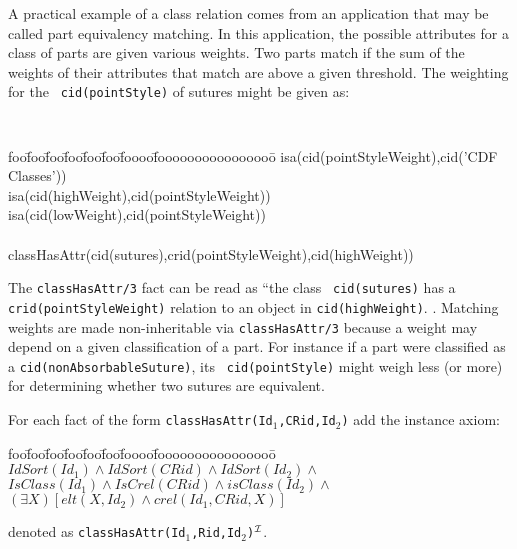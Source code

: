 \begin{example} \label{ex:strel} \rm 
A practical example of a class relation comes from an application that
may be called part equivalency matching.  In this application, the
possible attributes for a class of parts are given various weights.
Two parts match if the sum of the weights of their attributes that
match are above a given threshold.  The weighting for the {\tt
cid(pointStyle)} of sutures might be given as:
{\small 
{\tt 
\begin{tabbing}
foo\=foo\=foo\=foo\=foo\=foo\=foooo\=foooooooooooooooo\=\kill
\> isa(cid(pointStyleWeight),cid('CDF Classes')) \\
\> \> isa(cid(highWeight),cid(pointStyleWeight)) \\
\> \> isa(cid(lowWeight),cid(pointStyleWeight)) \\
\\
\> classHasAttr(cid(sutures),crid(pointStyleWeight),cid(highWeight))
\end{tabbing}
} }
\noindent
The {\tt classHasAttr/3} fact can be read as ``the class {\tt
cid(sutures)} has a {\tt crid(pointStyleWeight)} relation to an object
in {\tt cid(highWeight)}.  .  Matching weights are made
non-inheritable via {\tt classHasAttr/3} because a weight may depend
on a given classification of a part.  For instance if a part were
classified as a {\tt cid(nonAbsorbableSuture)}, its {\tt
cid(pointStyle)} might weigh less (or more) for determining whether
two sutures are equivalent.
\end{example}
\begin{instance}  \rm 
For each fact of the form {\tt classHasAttr(Id$_1$,CRid,Id$_2$)} add the
instance axiom: 
\begin{tabbing}
foo\=foo\=foo\=foo\=foo\=foo\=foooo\=foooooooooooooooo\=\kill
\> $ IdSort(Id_1) \wedge IdSort(CRid) \wedge IdSort(Id_2) \wedge $ \\
\> \> $ IsClass(Id_1) \wedge IsCrel(CRid) \wedge isClass(Id_2) \wedge $ \\
\> \> \> $ (\exists X) [elt(X,Id_2) \wedge crel(Id_1,CRid,X)] $
\end{tabbing}
denoted as {\tt classHasAttr(Id$_1$,Rid,Id$_2$)$^{{\cal I}}$}.
\end{instance}


